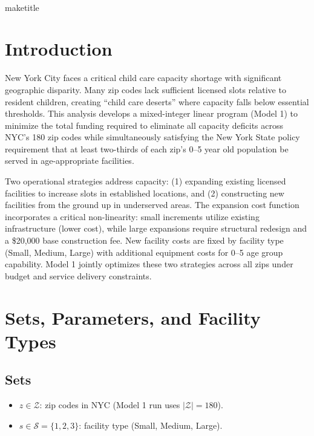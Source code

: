 \documentclass[12pt]{article}
\begin{document}
\\maketitle

\section{Introduction}

New York City faces a critical child care capacity shortage with significant geographic disparity. Many zip codes lack sufficient licensed slots relative to resident children, creating ``child care deserts'' where capacity falls below essential thresholds. This analysis develops a mixed-integer linear program (Model 1) to minimize the total funding required to eliminate all capacity deficits across NYC's 180 zip codes while simultaneously satisfying the New York State policy requirement that at least two-thirds of each zip's 0--5 year old population be served in age-appropriate facilities.

Two operational strategies address capacity: (1) expanding existing licensed facilities to increase slots in established locations, and (2) constructing new facilities from the ground up in underserved areas. The expansion cost function incorporates a critical non-linearity: small increments utilize existing infrastructure (lower cost), while large expansions require structural redesign and a \$20,000 base construction fee. New facility costs are fixed by facility type (Small, Medium, Large) with additional equipment costs for 0--5 age group capability. Model 1 jointly optimizes these two strategies across all zips under budget and service delivery constraints.

\section{Sets, Parameters, and Facility Types}

\subsection{Sets}
\begin{itemize}
    \item $z \in \mathcal{Z}$: zip codes in NYC (Model 1 run uses $|\mathcal{Z}|=180$).
    \item $s \in \mathcal{S}=\{1,2,3\}$: facility type (Small, Medium, Large).
\end{itemize}
\end{document}

